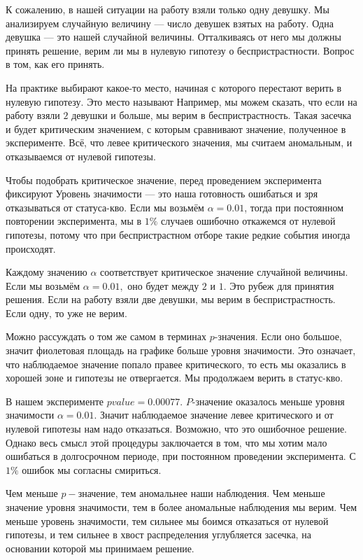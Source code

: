 \documentclass[12pt, a4paper, oneside]{article}
\begin{document}
К сожалению, в нашей ситуации на работу взяли только одну девушку. Мы анализируем случайную величину --- число девушек взятых на работу. Одна девушка --- это  нашей случайной величины. Отталкиваясь от него мы должны принять решение, верим ли мы в нулевую гипотезу о беспристрастности. Вопрос в том, как его принять. 

На практике выбирают какое-то место, начиная с которого перестают верить в нулевую гипотезу. Это место называют  Например, мы можем сказать, что если на работу взяли $2$ девушки и больше, мы верим в беспристрастность. Такая засечка и будет критическим значением, с которым сравнивают значение, полученное в эксперименте. Всё, что левее критического значения, мы считаем аномальным, и отказываемся от нулевой гипотезы. 

Чтобы подобрать критическое значение, перед проведением эксперимента фиксируют  Уровень значимости --- это наша готовность ошибаться и зря отказываться от статуса-кво. Если мы возьмём $\alpha = 0.01$, тогда при постоянном повторении эксперимента, мы в $1\%$ случаев ошибочно откажемся от нулевой гипотезы, потому что при беспристрастном отборе такие редкие события иногда происходят. 

Каждому значению $\alpha$ соответствует критическое значение случайной величины. Если мы возьмём $\alpha = 0.01,$ оно будет между $2$ и $1$. Это рубеж для принятия решения. Если на работу взяли две девушки, мы верим в беспристрастность. Если одну, то уже не верим. 

Можно рассуждать о том же самом в терминах $p$-значения. Если оно большое, значит фиолетовая площадь на графике больше уровня значимости. Это означает, что наблюдаемое значение попало правее критического, то есть мы оказались в хорошей зоне и гипотезы не отвергается. Мы продолжаем верить в статус-кво.

В нашем эксперименте $pvalue = 0.00077.$ $P$-значение оказалось меньше уровня значимости $\alpha=0.01$. Значит наблюдаемое значение левее критического и от нулевой гипотезы нам надо отказаться. Возможно, что это ошибочное решение. Однако весь смысл этой процедуры заключается в том, что мы хотим мало ошибаться в долгосрочном периоде, при постоянном проведении эксперимента. С $1\%$ ошибок мы согласны смириться. 

Чем меньше $p-$значение, тем аномальнее наши наблюдения. Чем меньше значение уровня значимости, тем в более аномальные наблюдения мы верим. Чем меньше уровень значимости, тем сильнее мы боимся отказаться от нулевой гипотезы, и тем сильнее в хвост распределения углубляется засечка, на основании которой мы принимаем решение. 
\end{document}
